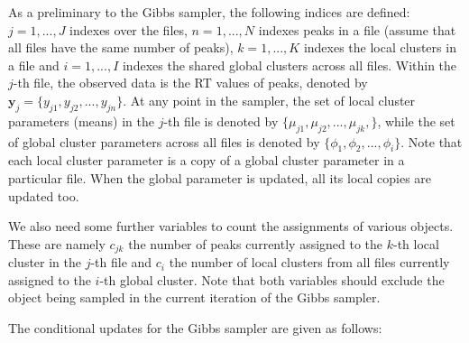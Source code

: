 As a preliminary to the Gibbs sampler, the following indices are defined: $j=1,...,J$ indexes over the files, $n=1,...,N$ indexes peaks in a file (assume that all files have the same number of peaks), $k=1,...,K$ indexes the local clusters in a file and $i=1,...,I$ indexes the shared global clusters across all files. Within the $j$-th file, the observed data is the RT values of peaks, denoted by $\boldsymbol{y}_j=\{y_{j1}, y_{j2}, ..., y_{jn}\}$. At any point in the sampler, the set of local cluster parameters (means) in the $j$-th file is denoted by $\{\mu_{j1}, \mu_{j2}, ..., \mu_{jk},\}$, while the set of global cluster parameters across all files is denoted by $\{\phi_1, \phi_2, ..., \phi_i\}$. Note that each local cluster parameter is a copy of a global cluster parameter in a particular file. When the global parameter is updated, all its local copies are updated too.

We also need some further variables to count the assignments of various objects. These are namely $c_{jk}$ the number of peaks currently assigned to the $k$-th local cluster in the $j$-th file and $c_{i}$ the number of local clusters from all files currently assigned to the $i$-th global cluster. Note that both variables should exclude the object being sampled in the current iteration of the Gibbs sampler.

The conditional updates for the Gibbs sampler are given as follows:

